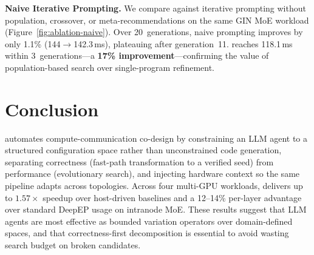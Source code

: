 \noindent\textbf{Naive Iterative Prompting.}
We compare against iterative prompting without population, crossover, or meta-recommendations on the same GIN MoE workload (Figure~\ref{fig:ablation-naive}). Over 20~generations, naive prompting improves by only 1.1\% (144$\to$142.3\,ms), plateauing after generation~11. \cufuse{} reaches 118.1\,ms within 3~generations---a \textbf{17\% improvement}---confirming the value of population-based search over single-program refinement.

\vspace{-8pt}
\section{Conclusion}
\vspace{-8pt}
\cufuse{} automates compute-communication co-design by constraining an LLM agent to a structured configuration space rather than unconstrained code generation, separating correctness (fast-path transformation to a verified seed) from performance (evolutionary search), and injecting hardware context so the same pipeline adapts across topologies. Across four multi-GPU workloads, \cufuse{} delivers up to $1.57\times$ speedup over host-driven baselines and a 12--14\% per-layer advantage over standard DeepEP usage on intranode MoE. These results suggest that LLM agents are most effective as bounded variation operators over domain-defined spaces, and that correctness-first decomposition is essential to avoid wasting search budget on broken candidates.


